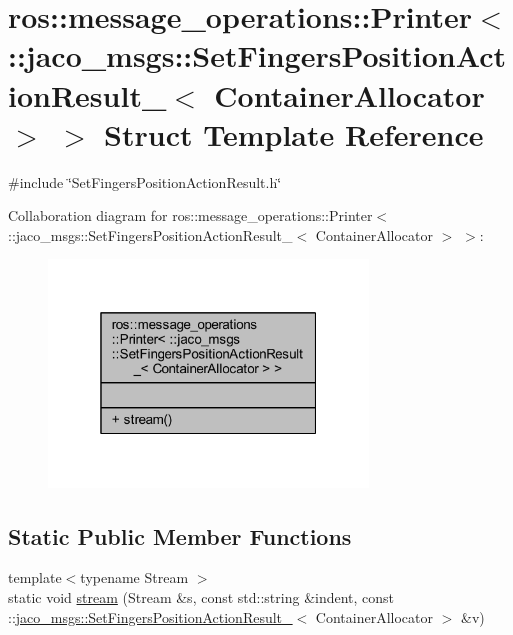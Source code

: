 \hypertarget{structros_1_1message__operations_1_1Printer_3_01_1_1jaco__msgs_1_1SetFingersPositionActionResult044e352a34a7e800d3ed4a693b89337f}{}\section{ros\+:\+:message\+\_\+operations\+:\+:Printer$<$ \+:\+:jaco\+\_\+msgs\+:\+:Set\+Fingers\+Position\+Action\+Result\+\_\+$<$ Container\+Allocator $>$ $>$ Struct Template Reference}
\label{structros_1_1message__operations_1_1Printer_3_01_1_1jaco__msgs_1_1SetFingersPositionActionResult044e352a34a7e800d3ed4a693b89337f}


{\ttfamily \#include \char`\"{}Set\+Fingers\+Position\+Action\+Result.\+h\char`\"{}}



Collaboration diagram for ros\+:\+:message\+\_\+operations\+:\+:Printer$<$ \+:\+:jaco\+\_\+msgs\+:\+:Set\+Fingers\+Position\+Action\+Result\+\_\+$<$ Container\+Allocator $>$ $>$\+:
\nopagebreak
\begin{figure}[H]
\begin{center}
\leavevmode
\includegraphics[width=241pt]{de/d0b/structros_1_1message__operations_1_1Printer_3_01_1_1jaco__msgs_1_1SetFingersPositionActionResult897b0a7740137d468ec0af956fbd61b1}
\end{center}
\end{figure}
\subsection*{Static Public Member Functions}
\begin{DoxyCompactItemize}
\item 
{\footnotesize template$<$typename Stream $>$ }\\static void \hyperlink{structros_1_1message__operations_1_1Printer_3_01_1_1jaco__msgs_1_1SetFingersPositionActionResult044e352a34a7e800d3ed4a693b89337f_a6c16a0d639132e8751510460c02e8b4e}{stream} (Stream \&s, const std\+::string \&indent, const \+::\hyperlink{structjaco__msgs_1_1SetFingersPositionActionResult__}{jaco\+\_\+msgs\+::\+Set\+Fingers\+Position\+Action\+Result\+\_\+}$<$ Container\+Allocator $>$ \&v)
\end{DoxyCompactItemize}


